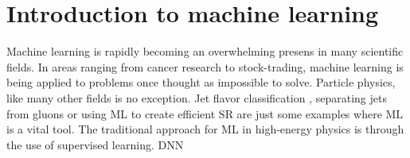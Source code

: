 \chapter{Introduction to machine learning}\label{chap:Intro ML}
Machine learning is rapidly becoming an overwhelming presens in many scientific fields.
In areas ranging from cancer research to stock-trading, machine learning is being applied to problems
once thought as impossible to solve. Particle physics, like many other fields is no exception. Jet flavor classification \cite{Guest_2016}, 
separating jets from gluons \cite{PhysRevD.44.2025} or using \ac{ML} to create efficient \ac{SR} are just some examples
where \ac{ML} is a vital tool. The traditional approach for ML in high-energy physics is through the use 
of supervised learning. \ac{DNN}


